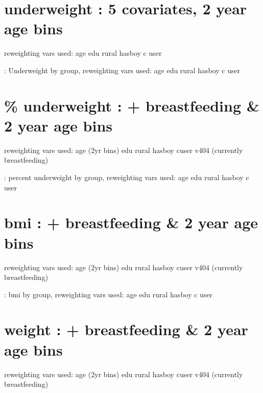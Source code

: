 \documentclass{article}
\begin{document}
\newpage 
\section{underweight : 5 covariates, 2 year age bins }

reweighting vars used: age edu rural hasboy c user

\begin{table}[H]
    \centering
    \footnotesize %
    \caption{: Underweight by group, reweighting vars used: age edu rural hasboy c user}
    \label{tab:sumstat}
\end{table}


\newpage 
\section{\% underweight : + breastfeeding \& 2 year age bins }

reweighting vars used: age (2yr bins) edu rural hasboy cuser v404 (currently breastfeeding)

\begin{table}[H]
    \centering
    \footnotesize %
    \caption{: percent underweight by group, reweighting vars used: age edu rural hasboy c user}
    \label{tab:sumstat}
\end{table}

\newpage 
\section{bmi : + breastfeeding \& 2 year age bins }

reweighting vars used: age (2yr bins) edu rural hasboy cuser v404 (currently breastfeeding)

\begin{table}[H]
    \centering
    \footnotesize %
    \caption{: bmi by group, reweighting vars used: age edu rural hasboy c user}
    \label{tab:sumstat}
\end{table}


\newpage 
\section{weight : + breastfeeding \& 2 year age bins }

reweighting vars used: age (2yr bins) edu rural hasboy cuser v404 (currently breastfeeding)
\end{document}
